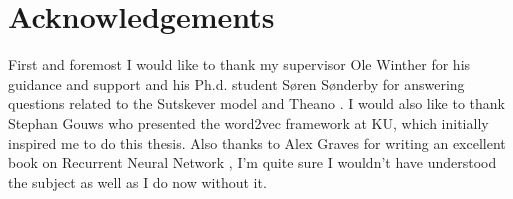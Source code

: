 \chapter{Acknowledgements}

First and foremost I would like to thank my supervisor Ole Winther for his guidance and support and his Ph.d. student Søren Sønderby for answering questions related to the Sutskever model \cite[p.~1]{sutskever} and Theano \cite{theano-a, theano-b}. I would also like to thank Stephan Gouws who presented the word2vec framework \cite{word2vec-comparing, word2vec-details} at KU, which initially inspired me to do this thesis. Also thanks to Alex Graves for writing an excellent book on Recurrent Neural Network \cite{alexgraves}, I'm quite sure I wouldn't have understood the subject as well as I do now without it.
